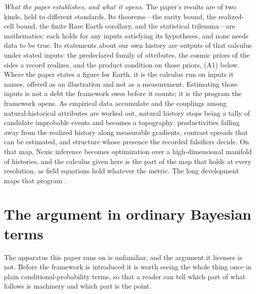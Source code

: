 \noindent\emph{What the paper establishes, and what it opens.} The paper's results are of two kinds, held to different standards. Its theorems---the rarity bound, the realized-cell bound, the finite Rare Earth corollary, and the statistical trilemma---are mathematics: each holds for any inputs satisfying its hypotheses, and none needs data to be true. Its statements about our own history are outputs of that calculus under stated inputs: the predeclared family of attributes, the cosmic priors of the sides a record realizes, and the product condition on those priors, (A1) below. Where the paper states a figure for Earth, it is the calculus run on inputs it names, offered as an illustration and not as a measurement. Estimating those inputs is not a debt the framework owes before it counts; it is the program the framework opens. As empirical data accumulate and the couplings among natural-historical attributes are worked out, natural history stops being a tally of candidate improbable events and becomes a topography: productivities falling away from the realized history along measurable gradients, contrast spreads that can be estimated, and structure whose presence the recorded falsifiers decide. On that map, Nexic inference becomes optimization over a high-dimensional manifold of histories, and the calculus given here is the part of the map that holds at every resolution, as field equations hold whatever the metric. The long development maps that program \cite{Nexus}.

\section{The argument in ordinary Bayesian terms}
\label{sec:plain}

The apparatus this paper runs on is unfamiliar, and the argument it licenses is not. Before the framework is introduced it is worth seeing the whole thing once in plain conditional-probability terms, so that a reader can tell which part of what follows is machinery and which part is the point.

